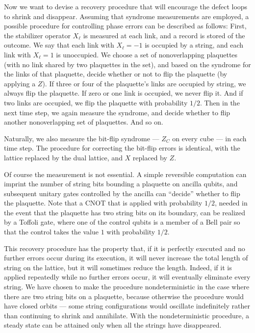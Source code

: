 Now we want to devise a recovery procedure that will encourage the defect loops
to shrink and disappear.  Assuming that syndrome measurements are employed, a
possible procedure for controlling phase errors can be described as follows:
First, the stabilizer operator $X_\ell$ is measured at each link, and a record
is stored of the outcome.  We say that each link with $X_\ell=-1$ is occupied
by a string, and each link with $X_\ell=1$ is unoccupied.  We choose a set of
nonoverlapping plaquettes (with no link shared by two plaquettes in the set),
and based on the syndrome for the links of that plaquette, decide whether or
not to flip the plaquette (by applying a $Z$).  If three or four of the
plaquette's links are occupied by string, we always flip the plaquette.  If
zero or one link is occupied, we never flip it.  And if two links are occupied,
we flip the plaquette with probability $1/2$.  Then in the next time step, we
again measure the syndrome, and decide whether to flip another nonoverlapping
set of plaquettes.  And so on.

Naturally, we also measure the bit-flip syndrome --- $Z_C$ on every cube ---
in each time step. The procedure for correcting the bit-flip errors is
identical, with the lattice replaced by the dual lattice, and $X$ replaced by
$Z$.

Of course the measurement is not essential.  A simple reversible computation
can imprint the number of string bits bounding a plaquette on ancilla qubits,
and subsequent unitary gates controlled by the ancilla can ``decide'' whether
to flip the plaquette. Note that a CNOT that is applied with probability $1/2$,
needed in the event that the plaquette has two string bits on its boundary, can
be realized by a Toffoli gate, where one of the control qubits is a member of a
Bell pair so that the control takes the value $1$ with probability $1/2$.

This recovery procedure has the property that, if it is perfectly executed and
no further errors occur during its execution, it will never increase the total
length of string on the lattice, but it will sometimes reduce the length.
Indeed, if it is applied repeatedly while no further errors occur, it will
eventually eliminate every string.  We have chosen to make the procedure
nondeterministic in the case where there are two string bits on a plaquette,
because otherwise the procedure would have closed orbits --- some string
configurations would oscillate indefinitely rather than continuing to shrink
and annihilate.  With the nondeterministic procedure, a steady state can be
attained only when all the strings have disappeared.

